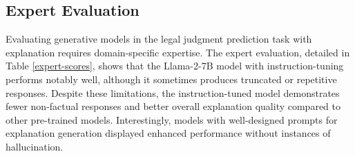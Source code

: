 

\subsection{Expert Evaluation}
\label{subsec:expert_evaluation}
Evaluating generative models in the legal judgment prediction task with explanation requires domain-specific expertise. The expert evaluation, detailed in Table \ref{expert-scores}, shows that the Llama-2-7B model with instruction-tuning performs notably well, although it sometimes produces truncated or repetitive responses. Despite these limitations, the instruction-tuned model demonstrates fewer non-factual responses and better overall explanation quality compared to other pre-trained models. Interestingly, models with well-designed prompts for explanation generation displayed enhanced performance without instances of hallucination.


